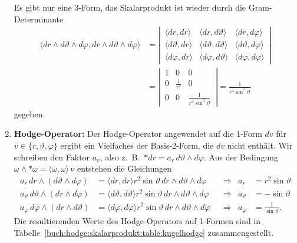 \begin{enumerate}
Es gibt nur eine 3-Form, das Skalarprodukt ist wieder durch die 
Gram-Determinante
\begin{align*}
\langle
dr\wedge d\vartheta \wedge d\varphi,
dr\wedge d\vartheta \wedge d\varphi
\rangle
&=
\left|\,
\begin{matrix}
\langle dr, dr \rangle
&\langle dr, d\vartheta \rangle
&\langle dr, d\varphi \rangle
\\
\langle d\vartheta, dr \rangle
&\langle d\vartheta, d\vartheta \rangle
&\langle d\vartheta, d\varphi \rangle
\\
\langle d\varphi, dr \rangle
&\langle d\varphi, d\vartheta \rangle
&\langle d\varphi, d\varphi \rangle
\end{matrix}
\,\right|
\\
&=
\left|\,\begin{matrix}
1 & 0 & 0 \\
0 & \frac{1}{r^2} & 0 \\
0 & 0 & \frac{1}{r^2\sin^2\vartheta}
\end{matrix}\,\right|
=
\frac{1}{r^4\sin^2\vartheta}
\end{align*}
gegeben.
\item {\bf Hodge-Operator:}
Der Hodge-Operator angewendet auf die 1-Form $dv$ für
$v\in\{r,\vartheta,\varphi\}$  ergibt ein Vielfaches der Basis-2-Form,
die $dv$ nicht enthält.
Wir schreiben den Faktor $a_v$, also
z.~B.~$*dr = a_r\,d\vartheta\wedge d\varphi$.
Aus der Bedingung $\omega\wedge {\ast\omega}=\langle\omega,\omega\rangle\,\nu$
entstehen die Gleichungen
\begin{align*}
a_r\,
dr\wedge(d\vartheta\wedge d\varphi)
&=
\langle dr, dr\rangle
r^2\sin\vartheta\, dr\wedge d\vartheta\wedge d\varphi
&&\Rightarrow&
a_r &= r^2 \sin\vartheta
\\
a_\vartheta\,
d\vartheta \wedge(dr \wedge d\varphi)
&=
\langle d\vartheta,d\vartheta\rangle
r^2\sin\vartheta\,dr\wedge d\vartheta\wedge d\varphi
&&\Rightarrow&
a_\vartheta &= -\sin\vartheta
\\
a_\varphi\,
d\varphi \wedge(dr \wedge d\vartheta)
&=
\langle d\varphi,d\varphi\rangle
r^2\sin\vartheta\,dr\wedge d\vartheta\wedge d\varphi
&&\Rightarrow&
a_\varphi &= \frac{1}{\sin\vartheta}.
\end{align*}
Die resultierenden Werte des Hodge-Operators auf 1-Formen sind in
Tabelle~\ref{buch:hodge:skalarprodukt:table:kugelhodge} zusammengestellt.


\end{enumerate}
